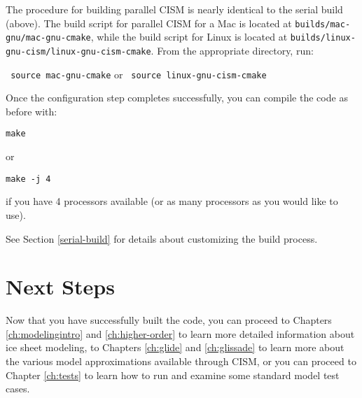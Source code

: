 The procedure for building parallel CISM is nearly identical to the serial build (above).
The build script for parallel CISM for a Mac is located at \texttt{builds/mac-gnu/mac-gnu-cmake}, 
while the build script for Linux is located at \texttt{builds/linux-gnu-cism/linux-gnu-cism-cmake}.
From the appropriate directory, run:

\texttt{ source mac-gnu-cmake} or \texttt{ source linux-gnu-cism-cmake}

Once the configuration step completes successfully, you can compile the code as before with:

\texttt{make}

or

\texttt{make -j 4}

if you have 4 processors available (or as many processors as you would like to use).

See Section \ref{serial-build} for details about customizing the build process.


\section{Next Steps}

Now that you have successfully built the code, you can proceed to Chapters \ref{ch:modelingintro} and \ref{ch:higher-order} to learn more detailed 
information about ice sheet modeling, to Chapters \ref{ch:glide} and \ref{ch:glissade} to learn more about the various model approximations 
available through CISM, or you can proceed to Chapter \ref{ch:tests} to learn how to run and examine some standard model test cases.  


